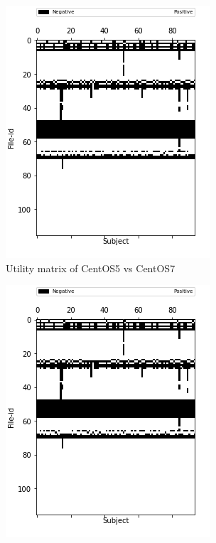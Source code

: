\documentclass[10pt, conference, compsocconf]{IEEEtran}
\begin{document}
\begin{figure}[h!]
\begin{subfigure}[b]{0.5\linewidth}
	 \includegraphics[width=\columnwidth]{figures/utility_5vs7_PFS}
  \caption{Utility matrix of CentOS5 vs CentOS7}
  \end{subfigure}
  \begin{subfigure}[b]{0.5\linewidth}
	\includegraphics[width=\columnwidth]{figures/utility_6vs7_PFS}

\end{subfigure}
\end{figure}
\end{document}
